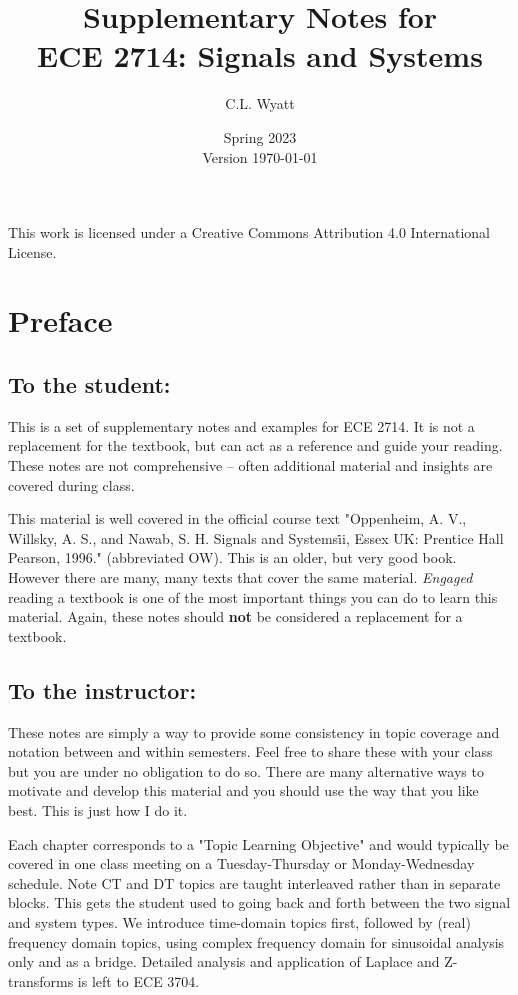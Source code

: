 \documentclass[]{book}
\theoremstyle{definition}
\numberwithin{section}{chapter}
\numberwithin{equation}{chapter}
\begin{document}
\frontmatter

\title{Supplementary Notes for\\ ECE 2714: Signals and Systems}
\author{C.L. Wyatt}
\date{Spring 2023\\Version \today}
\maketitle
This work is licensed under a Creative Commons Attribution 4.0 International License.

\chapter*{Preface}

\section*{To the student:}
This is a set of supplementary notes and examples for ECE 2714. It is not a replacement for the textbook, but can act as a reference and guide your reading. These notes are not comprehensive -- often additional material and insights are covered during class.

This material is well covered in the official course text "Oppenheim, A. V., Willsky, A. S., and Nawab, S. H. Signals and Systems\. ii, Essex UK: Prentice Hall Pearson, 1996." \cite{OW} (abbreviated OW). This is an older, but very good book. However there are many, many texts that cover the same material. \textit{Engaged} reading a textbook is one of the most important things you can do to learn this material. Again, these notes should \textbf{not} be considered a replacement for a textbook.

\section*{To the instructor:}
These notes are simply a way to provide some consistency in topic coverage and notation between and within semesters. Feel free to share these with your class but you are under no obligation to do so. There are many alternative ways to motivate and develop this material and you should use the way that you like best. This is just how I do it.

Each chapter corresponds to a "Topic Learning Objective" and would typically be covered in one class meeting on a Tuesday-Thursday or Monday-Wednesday schedule. Note CT and DT topics are taught interleaved rather than in separate blocks. This gets the student used to going back and forth between the two signal and system types. We introduce time-domain topics first, followed by (real) frequency domain topics, using complex frequency domain for sinusoidal analysis only and as a bridge. Detailed analysis and application of Laplace and Z-transforms is left to ECE 3704. 
\end{document}
